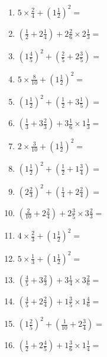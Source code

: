 \documentclass[12pt]{article}
\begin{document}
\begin{enumerate}
\item \large $ 5 \times \frac{2}{4} + (1 \frac{1}{2})^2 = $ \vspace{1.8cm}
\item \large $ (\frac{1}{2} + 2 \frac{1}{4}) + 2 \frac{2}{6} \times 2 \frac{1}{3} = $ \vspace{1.8cm}
\item \large $ (1 \frac{4}{5})^2 + (\frac{2}{5} + 2 \frac{3}{5}) = $ \vspace{1.8cm}
\item \large $ 5 \times \frac{8}{10} + (1 \frac{1}{2})^2 = $ \vspace{1.8cm}
\item \large $ (1 \frac{1}{2})^2 + (\frac{1}{2} + 3 \frac{1}{5}) = $ \vspace{1.8cm}
\newpage
\item \large $ (\frac{1}{3} + 3 \frac{2}{3}) + 3 \frac{1}{6} \times 1 \frac{1}{3} = $ \vspace{1.8cm}
\item \large $ 2 \times \frac{3}{10} + (1 \frac{1}{2})^2 = $ \vspace{1.8cm}
\item \large $ (1 \frac{1}{2})^2 + (\frac{1}{2} + 1 \frac{3}{4}) = $ \vspace{1.8cm}
\item \large $ (2 \frac{2}{3})^2 + (\frac{1}{4} + 2 \frac{2}{4}) = $ \vspace{1.8cm}
\item \large $ (\frac{2}{10} + 2 \frac{2}{4}) + 2 \frac{3}{5} \times 3 \frac{2}{3} = $ \vspace{1.8cm}
\item \large $ 4 \times \frac{2}{3} + (1 \frac{1}{2})^2 = $ \vspace{1.8cm}
\item \large $ 5 \times \frac{1}{3} + (1 \frac{1}{2})^2 = $ \vspace{1.8cm}
\item \large $ (\frac{4}{5} + 3 \frac{2}{3}) + 3 \frac{1}{4} \times 3 \frac{2}{6} = $ \vspace{1.8cm}
\item \large $ (\frac{4}{5} + 2 \frac{2}{4}) + 1 \frac{3}{5} \times 1 \frac{4}{6} = $ \vspace{1.8cm}
\item \large $ (1 \frac{2}{5})^2 + (\frac{1}{10} + 2 \frac{3}{4}) = $ \vspace{1.8cm}
\newpage
\item \large $ (\frac{1}{2} + 2 \frac{4}{5}) + 1 \frac{3}{6} \times 1 \frac{1}{4} = $ \vspace{1.8cm}

\end{enumerate}
\end{document}
